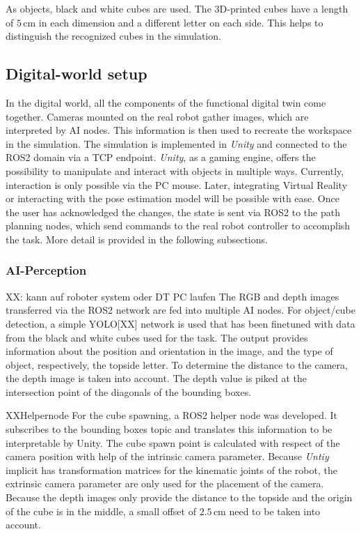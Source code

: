 \documentclass{bmvc2k}
\begin{document}
As objects, black and white cubes are used. The 3D-printed cubes have a length of $5\,\mathrm{cm}$ in each dimension and a different letter on each side. This helps to distinguish the recognized cubes in the simulation. 

\subsection{Digital-world setup}
\label{dw:setup}
In the digital world, all the components of the functional digital twin come together. Cameras mounted on the real robot gather images, which are interpreted by AI nodes. This information is then used to recreate the workspace in the simulation. The simulation is implemented in \textit{Unity} and connected to the ROS2 domain via a TCP endpoint. \textit{Unity}, as a gaming engine, offers the possibility to manipulate and interact with objects in multiple ways. Currently, interaction is only possible via the PC mouse. Later, integrating Virtual Reality or interacting with the pose estimation model will be possible with ease. Once the user has acknowledged the changes, the state is sent via ROS2 to the path planning nodes, which send commands to the real robot controller to accomplish the task. More detail is provided in the following subsections.

\subsubsection{AI-Perception}
\label{dw:perception}
XX: kann auf roboter system oder DT PC laufen
The RGB and depth images transferred via the ROS2 network are fed into multiple AI nodes. For object/cube detection, a simple YOLO[XX] network is used that has been finetuned with data from the black and white cubes used for the task. The output provides information about the position and orientation in the image, and the type of object, respectively, the topside letter. To determine the distance to the camera, the depth image is taken into account. The depth value is piked at the intersection point of the diagonals of the bounding boxes.

XXHelpernode
For the cube spawning, a ROS2 helper node was developed. It subscribes to the bounding boxes topic and translates this information to be interpretable by Unity. The cube spawn point is calculated with respect of the camera position with help of the intrinsic camera parameter. Because \textit{Untiy} implicit has transformation matrices for the kinematic joints of the robot, the extrinsic camera parameter are only used for the placement of the camera. Because the depth images only provide the distance to the topside and the origin of the cube is in the middle, a small offset of $2.5\,\mathrm{cm}$ need to be taken into account.
\end{document}
